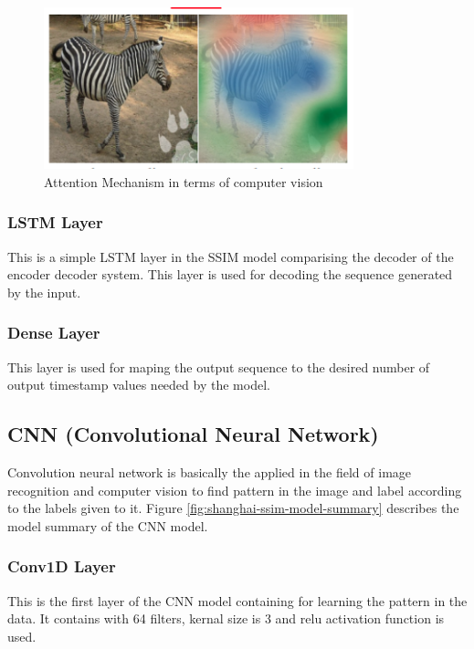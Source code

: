 	\begin{figure}[ht]
		\centering
		\includegraphics[width=0.8\textwidth]{images/attention.png}
		\caption{Attention Mechanism in terms of computer vision}
		\label{fig:attention}
	\end{figure}

	\subsubsection{LSTM Layer}
	This is a simple LSTM layer in the SSIM model comparising the decoder of the encoder decoder system. This layer is used for decoding the sequence generated by the input.

	\subsubsection{Dense Layer}
	This layer is used for maping the output sequence to the desired number of output timestamp values needed by the model.



\subsection{CNN (Convolutional Neural Network)}

	Convolution neural network is basically the applied in the field of image recognition and computer vision to find pattern in the image and label according to the labels given to it. Figure \ref{fig:shanghai-ssim-model-summary} describes the model summary of the CNN model.

	\subsubsection{Conv1D Layer}
		This is the first layer of the CNN model containing for learning the pattern in the data. It contains with 64 filters, kernal size is 3 and relu activation function is used.

